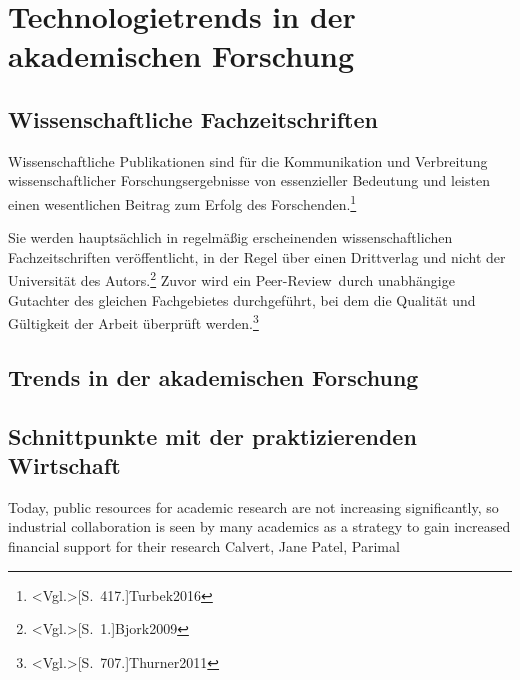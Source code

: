 \section{Technologietrends in der akademischen Forschung}
\subsection{Wissenschaftliche Fachzeitschriften}
Wissenschaftliche Publikationen sind für die Kommunikation und Verbreitung wissenschaftlicher Forschungsergebnisse von essenzieller Bedeutung und leisten einen wesentlichen Beitrag zum Erfolg des Forschenden.\footnote{\citeNP<Vgl.>[S.~417.]{Turbek2016}}

Sie werden hauptsächlich in regelmäßig erscheinenden wissenschaftlichen Fachzeitschriften veröffentlicht, in der Regel über einen Drittverlag und nicht der Universität des Autors.\footnote{\citeNP<Vgl.>[S.~1.]{Bjork2009}} Zuvor wird ein \glqq Peer-Review\grqq~durch unabhängige Gutachter des gleichen Fachgebietes durchgeführt, bei dem die Qualität und Gültigkeit der Arbeit überprüft werden.\footnote{\citeNP<Vgl.>[S.~707.]{Thurner2011}}

\subsection{Trends in der akademischen Forschung}
\subsection{Schnittpunkte mit der praktizierenden Wirtschaft}
Today, public resources for academic research are
not increasing significantly, so industrial collaboration is seen by many academics as a strategy to gain increased financial support for their research
Calvert, Jane
Patel, Parimal